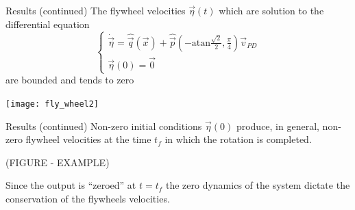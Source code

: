 \begin{frame}{Results (continued) \hfill \color{dgreen}{ZYX}}
  The flywheel velocities $\vec{\eta}(t)$ which are
  solution to the differential equation
  \[
  \begin{cases}
    \dot{\vec{\eta}} = \hat{\vec{q}}(\vec{x}) + \hat{\vec{p}}\left(-\mathrm{atan}\frac{\sqrt{2}}{2},\frac{\pi}{4}\right)\vec{v}_{PD}\\
    \vec{\eta}(0) = \vec{0}
  \end{cases}
  \]
  are bounded and tends to zero
  \par
  \centering
  \texttt{[image: fly\_wheel2]}
\end{frame}

\begin{frame}{Results (continued) \hfill \color{dgreen}{ZYX}}
  Non-zero initial conditions $\vec{\eta}(0)$ produce, in general,
  non-zero flywheel velocities at the time $t_f$ in which the
  rotation is completed.
  \par
  (FIGURE - EXAMPLE)
  \par
  Since the output is ``zeroed'' at $t=t_f$ the zero dynamics of the system
  dictate the conservation of the flywheels velocities.
\end{frame}


